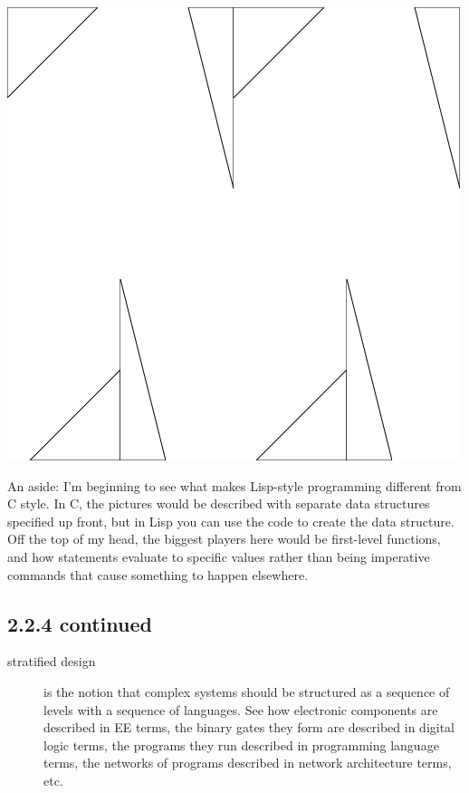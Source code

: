 \documentclass[final,fleqn,titlepage,twoside]{article}
\begin{document}
\begin{center}
\includegraphics[width=.9\linewidth]{2/pict/rotate3.png}
\end{center}

An aside: I'm beginning to see what makes Lisp-style programming different from
C style. In C, the pictures would be described with separate data structures
specified up front, but in Lisp you can use the code to create the data
structure. Off the top of my head, the biggest players here would be first-level
functions, and how statements evaluate to specific values rather than being
imperative commands that cause something to happen elsewhere.

\subsection{2.2.4 continued}
\label{sec:org70a2605}
\begin{description}
\item[{stratified design}] is the notion that complex systems should be structured
as a sequence of levels with a sequence of languages. See how electronic
components are described in EE terms, the binary gates they form are described
in digital logic terms, the programs they run described in programming
language terms, the networks of programs described in network architecture
terms, etc.
\end{description}
\end{document}
